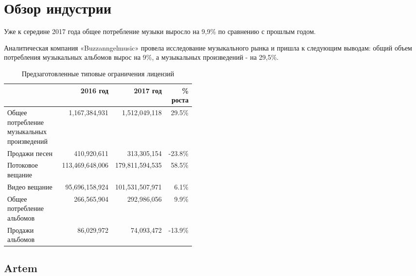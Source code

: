 \documentclass[12pt]{report}
\def\code#1{\colorbox{light-gray}{\texttt{#1}}}
\begin{document}
\chapter{Обзор индустрии}
\label{industry}
Уже к середине 2017 года общее потребление музыки выросло на 9,9\% по сравнению с прошлым годом. 

Аналитическая компания «Buzzanngelmusic» провела исследование музыкального рынка и пришла к следующим выводам: общий объем потребления музыкальных альбомов вырос на 9\%, а музыкальных произведений - на 29,5\%.  

\def\Prev{2016 год}
\def\Current{2017 год}
\def\Grow{\% роста}
\def\Summary{Общее потребление музыкальных произведений}
\def\Sales{Продажи песен}
\def\Streaming{Потоковое вещание}
\def\VideoStreaming{Видео вещание}
\def\Albums{Общее потребление альбомов}
\def\AlbumsSales{Продажи альбомов}
\def\TracksSales{Продажи песен}

\begin{table}[h]
\centering
\caption{Предзаготовленные типовые ограничения лицензий}
\begin{tabular}{p{0.45\linewidth}rrr}%
\toprule
& \Prev & \Current & \Grow \\
\bottomrule
\toprule
\midrule
\Summary 			& 1,167,384,931 		& 1,512,049,118 		& 29.5\% \\
\Sales 					& 410,920,611 			& 313,305,154 			& -23.8\% \\
\Streaming 			& 113,469,648,006 	& 179,811,594,535 	& 58.5\% \\
\VideoStreaming 	& 95,696,158,924 	& 101,531,507,971		& 6.1\% \\
\Albums 				& 266,565,904 		& 292,986,056 		& 9.9\% \\
\AlbumsSales 		& 86,029,972 			& 74,093,472	 		& -13.9\% \\
\bottomrule
\end{tabular}
\end{table}

\vfill\null\pagebreak
\section{Artem}
\label{industry-distribution}

\newcommand{\slice}[4]{
  \pgfmathparse{0.5*#1+0.5*#2}
  \let\midangle\pgfmathresult

  \draw[thick,fill=black!10] (0,0) -- (#1:1) arc (#1:#2:1) -- cycle;

  \node[label=\midangle:#4] at (\midangle:1) {};

  \pgfmathparse{min((#2-#1-10)/110*(-0.3),0)}
  \let\temp\pgfmathresult
  \pgfmathparse{max(\temp,-0.5) + 0.8}
  \let\innerpos\pgfmathresult
  \node at (\midangle:\innerpos) {#3};
}
\end{document}

